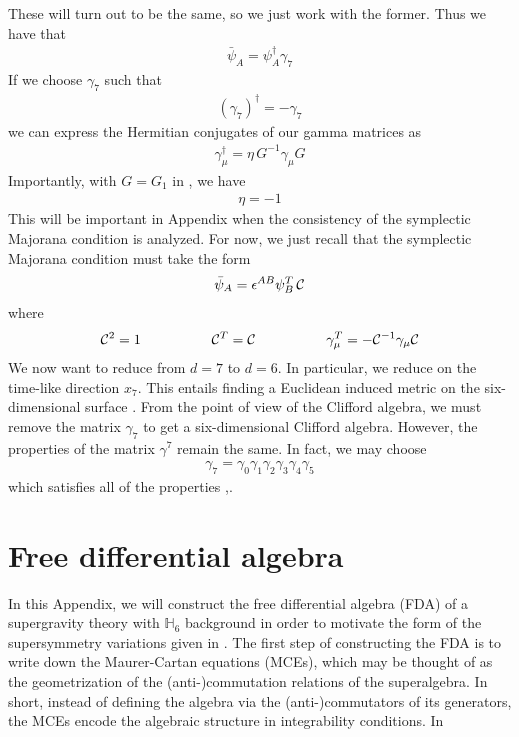 \documentclass[12pt]{article}
\begin{document}
These will turn out to be the same, so we just work with the former. Thus we have that 
\begin{eqnarray}
\bar \psi_A = \psi_A^\dagger \gamma_7
\end{eqnarray}
If we choose $\gamma_7$ such that 
\begin{eqnarray}
(\gamma_7)^\dagger = - \gamma_7
\end{eqnarray}
we can express the Hermitian conjugates of our gamma matrices as
\begin{eqnarray}
\gamma_\mu^\dagger = \eta\, G^{-1} \gamma_\mu G
\end{eqnarray}
Importantly, with $G=G_1$ in , we have 
\begin{eqnarray}
\eta = -1
\end{eqnarray}
This will be important in Appendix  when the consistency of the symplectic Majorana condition is analyzed. 
For now, we just recall that the symplectic Majorana condition must take the form 
\begin{eqnarray}
\bar \psi_A = \epsilon^{AB} \psi_B^T\, {\cal C}
\end{eqnarray}
where 
\begin{eqnarray}
{\cal C}^2 = 1 \hspace{0.7 in} {\cal C}^T = {\cal C} \hspace{0.7in} \gamma_\mu^T = - {\cal C}^{-1} \gamma_\mu {\cal C}
\end{eqnarray}
We now want to reduce from $d=7$ to $d=6$. In particular, we reduce on the time-like direction $x_7$. This entails finding a Euclidean induced metric on the six-dimensional surface . From the point of view of the Clifford algebra, we must remove the matrix $\gamma_7$ to get a six-dimensional Clifford algebra. However, the properties of the matrix $\gamma^7$ remain the same. In fact, we may choose
\begin{eqnarray}
\gamma_7 = \gamma_0\gamma_1\gamma_2\gamma_3\gamma_4\gamma_5
\end{eqnarray}
which satisfies all of the properties ,.
\section{Free differential algebra}
\setcounter{equation}{0}
In this Appendix, we will construct the free differential algebra (FDA) of a supergravity theory with $\mathbb{H}_6$ background in order to motivate the form of the supersymmetry variations given in .
The first step of constructing the FDA is to write down the Maurer-Cartan equations (MCEs), which may be thought of as the geometrization of the (anti-)commutation relations of the superalgebra. In short, instead of defining the algebra via the (anti-)commutators of its generators, the MCEs encode the algebraic structure in integrability conditions. In 
\end{document}
